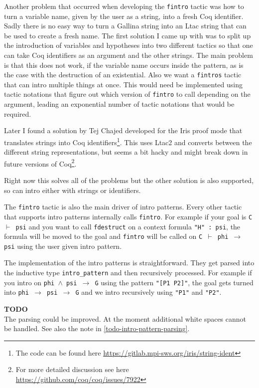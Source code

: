 \documentclass[12pt, a4paper]{article}
\newcommand{\coq}[1]{\texttt{#1}}
\newcommand{\improve}[1]{
	\vspace{3pt}
	\begin{boximprove}
		\parbox{\textwidth}{\textcolor{colorimprove}{\textbf{TODO}\\#1}}
	\end{boximprove}}
\begin{document}
\medskip\noindent
Another problem that occurred when developing the \texttt{fintro} tactic was how to turn a variable name, given by the user as a string, into a fresh Coq identifier.
Sadly there is no easy way to turn a Gallina string into an Ltac string that can be used to create a fresh name.
The first solution I came up with was to split up the introduction of variables and hypotheses into two different tactics  so that one can take Coq identifiers as an argument and the other strings.
The main problem is that this does not work, if the variable name occurs inside the pattern, as is the case with the destruction of an existential.
Also we want a \texttt{fintros} tactic that can intro multiple things at once.
This would need be implemented using tactic notations that figure out which version of \texttt{fintro} to call depending on the argument, leading an exponential number of tactic notations that would be required.

Later I found a solution by Tej Chajed developed for the Iris proof mode that translates strings into Coq identifiers\footnote{The code can be found here \url{https://gitlab.mpi-sws.org/iris/string-ident}}.
This uses Ltac2 and converts between the different string representations, but seems a bit hacky and might break down in future versions of Coq\footnote{For more detailed discussion see here \url{https://github.com/coq/coq/issues/7922}}.

Right now this solves all of the problems but the other solution is also supported, so can intro either with strings or identifiers.

\medskip\noindent
The \texttt{fintro} tactic is also the main driver of intro patterns.
Every other tactic that supports intro patterns internally calls \texttt{fintro}.
For example if your goal is \texttt{C $\vdash$ psi} and you want to call \texttt{fdestruct} on a context formula \coq{"H" : psi}, the formula will be moved to the goal and \texttt{fintro} will be called on \texttt{C $\vdash$ phi $\to$ psi} using the user given intro pattern.

The implementation of the intro patterns is straightforward.
They get parsed into the inductive type \texttt{intro\_pattern} and then recursively processed.
For example if you intro on \texttt{phi $\land$ psi $\to$ G} using the pattern \coq{"[P1 P2]"}, the goal gets turned into \texttt{phi $\to$ psi $\to$ G} and we intro recursively using \coq{"P1"} and \coq{"P2"}.

\improve{The parsing could be improved. At the moment additional white spaces cannot be handled. See also the note in \ref{todo-intro-pattern-parsing}.}
\end{document}
